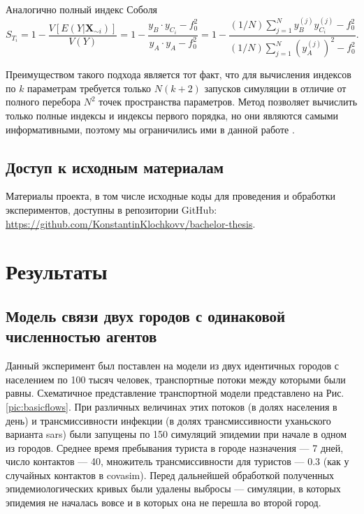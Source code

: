 \documentclass[a4paper,12pt]{article} %
\begin{document}
\begin{itemize}
Аналогично полный индекс Соболя
\begin{displaymath}
S_{T_i}=1-\frac{V[E(Y|\bm{X}_{\sim i})]}{V(Y)}=1-\frac{y_B\cdot y_{C_i}-f_0^2}{y_A\cdot y_A -f_0^2}=1-\frac{(1/N)\sum_{j=1}^N y_B^{(j)}y_{C_i}^{(j)} - f_0^2}{(1/N)\sum_{j=1}^N (y_A^{(j)})^2 - f_0^2}.
\end{displaymath}
\end{itemize}

Преимуществом такого подхода является тот факт, что для вычисления индексов по $k$ параметрам требуется только $N(k+2)$ запусков симуляции в отличие от полного перебора $N^2$ точек пространства параметров. Метод позволяет вычислить только полные индексы и индексы первого порядка, но они являются самыми информативными, поэтому мы ограничились ими в данной работе \cite{saltelli2008global}.

\subsection{Доступ к исходным материалам}
Материалы проекта, в том числе исходные коды для проведения и обработки экспериментов, доступны в репозитории GitHub: \href{https://github.com/KonstantinKlochkovv/bachelor-thesis}{https://github.com/KonstantinKlochkovv/bachelor-thesis}.

\newpage
\section{Результаты}

\subsection{Модель связи двух городов с одинаковой численностью агентов}
Данный эксперимент был поставлен на модели из двух идентичных городов с населением по 100 тысяч человек, транспортные потоки между которыми были равны. Схематичное представление транспортной модели представлено на Рис. \ref{pic:basicflows}. При различных величинах этих потоков (в долях населения в день) и трансмиссивности инфекции (в долях трансмиссивности уханьского варианта \gls{sars}) были запущены по 150 симуляций эпидемии при начале в одном из городов. Среднее время пребывания туриста в городе назначения --- 7 дней, число контактов --- 40, множитель трансмиссивности для туристов --- 0.3 (как у случайных контактов в \gls{covasim}). Перед дальнейшей обработкой полученных эпидемиологических кривых были удалены выбросы --- симуляции, в которых эпидемия не началась вовсе и в которых она не перешла во второй город. 
\end{document}
